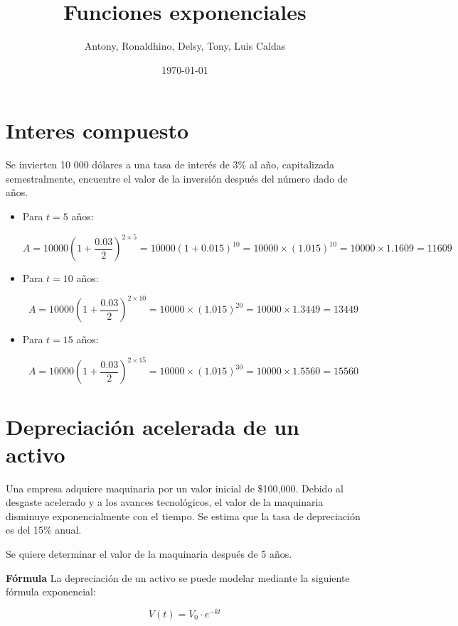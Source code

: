 \documentclass{article}
\begin{document}
\title{Funciones exponenciales}
\author{Antony, Ronaldhino, Delsy, Tony, Luis Caldas}
\date{\today}
\maketitle

\section{Interes compuesto}

Se invierten 10 000 dólares a una tasa de interés de 3\% al año, capitalizada semestralmente, encuentre el valor de la inversión después del número dado de años.

\begin{itemize}
    \item Para \( t = 5 \) años:

    \[
    A = 10000 \left( 1 + \frac{0.03}{2} \right)^{2 \times 5} = 10000 \left( 1 + 0.015 \right)^{10} = 10000 \times (1.015)^{10} = 10000 \times 1.1609 = 11609
    \]

    \item Para \( t = 10 \) años:

    \[
    A = 10000 \left( 1 + \frac{0.03}{2} \right)^{2 \times 10} = 10000 \times (1.015)^{20} = 10000 \times 1.3449 = 13449
    \]

    \item Para \( t = 15 \) años:

    \[
    A = 10000 \left( 1 + \frac{0.03}{2} \right)^{2 \times 15} = 10000 \times (1.015)^{30} = 10000 \times 1.5560 = 15560
    \]
\end{itemize}

\section{Depreciación acelerada de un activo}

Una empresa adquiere maquinaria por un valor inicial de \$100,000. Debido al desgaste acelerado y a los avances tecnológicos, el valor de la maquinaria disminuye exponencialmente con el tiempo. Se estima que la tasa de depreciación es del 15\% anual.

Se quiere determinar el valor de la maquinaria después de 5 años.

\textbf{Fórmula}
La depreciación de un activo se puede modelar mediante la siguiente fórmula exponencial:

\[
V(t) = V_0 \cdot e^{-kt}
\]
\end{document}
